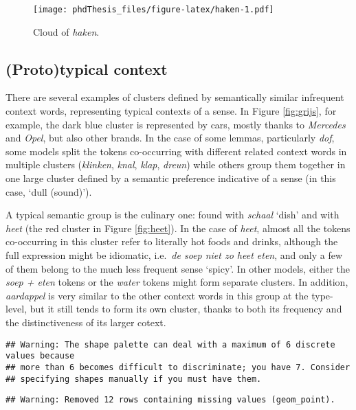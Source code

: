\documentclass[
]{book}
\begin{document}
\begin{figure}
\centering
\texttt{[image: phdThesis\_files/figure-latex/haken-1.pdf]}
\caption{\label{fig:haken}Cloud of \emph{haken}.}
\end{figure}

\hypertarget{prototypical-context-2}{%
\subsection{(Proto)typical context}\label{prototypical-context-2}}

There are several examples of clusters defined by semantically similar infrequent context words, representing typical contexts of a sense. In Figure \ref{fig:grijs}, for example, the dark blue cluster is represented by cars, mostly thanks to \emph{Mercedes} and \emph{Opel}, but also other brands. In the case of some lemmas, particularly \emph{dof}, some models split the tokens co-occurring with different related context words in multiple clusters (\emph{klinken}, \emph{knal}, \emph{klap}, \emph{dreun}) while others group them together in one large cluster defined by a semantic preference indicative of a sense (in this case, `dull (sound)').

A typical semantic group is the culinary one: found with \emph{schaal} `dish' and with \emph{heet} (the red cluster in Figure \ref{fig:heet}). In the case of \emph{heet}, almost all the tokens co-occurring in this cluster refer to literally hot foods and drinks, although the full expression might be idiomatic, i.e.~\emph{de soep niet zo heet eten}, and only a few of them belong to the much less frequent sense `spicy'. In other models, either the \emph{soep + eten} tokens or the \emph{water} tokens might form separate clusters. In addition, \emph{aardappel} is very similar to the other context words in this group at the type-level, but it still tends to form its own cluster, thanks to both its frequency and the distinctiveness of its larger cotext.



\begin{verbatim}
## Warning: The shape palette can deal with a maximum of 6 discrete values because
## more than 6 becomes difficult to discriminate; you have 7. Consider
## specifying shapes manually if you must have them.
\end{verbatim}

\begin{verbatim}
## Warning: Removed 12 rows containing missing values (geom_point).
\end{verbatim}
\end{document}
